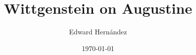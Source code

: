 \documentclass[doc,12pt,apacite,biblatex]{apa6}
\begin{document}
 \title{Wittgenstein on Augustine}
\author{Edward Hern\'{a}ndez}
\date{\today}

\maketitle

\nocite{Wittgenstein53}

\clearpage

{}  \printindex[autx]
\end{document}
